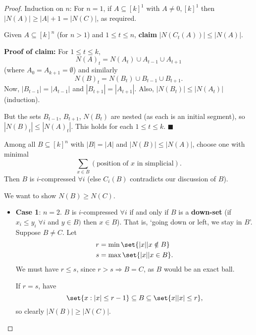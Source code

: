 \documentclass{article}
\let\subset\subseteq
\begin{document}
\begin{proof}
  Induction on $n$:
  For $n=1$, if $A \subset [k]^1$ with $A \neq 0, [k]^1$ then $|N(A)| \geq |A|+1 = |N(C)|$, as required.

  Given $A \subset [k]^n$ (for $n > 1$) and $1 \leq t \leq n$,
  \textbf{claim} $|N(C_t(A))| \leq |N(A)|$.

  \textbf{Proof of claim:}
  For $1 \leq t \leq k$,
  \begin{equation*}
    N(A)_t = N(A_t) \cup A_{t-1} \cup A_{t+1} %
  \end{equation*}
  (where $A_0 = A_{k+1}=\emptyset$) and similarly
  \begin{equation*}
    N(B)_t = N(B_t) \cup B_{t-1} \cup B_{t+1}.
  \end{equation*}
  Now, $|B_{t-1}| = |A_{t-1}|$ and $|B_{t+1}| = |A_{t+1}|$.
  Also, $|N(B_t)| \leq |N(A_t)|$ (induction).

  But the sets $B_{t-1}$, $B_{t+1}$, $N(B_t)$ are nested (as each is an initial segment), so $|N(B)_t| \leq |N(A)_t|$.
  This holds for each $1 \leq t \leq k$. $\blacksquare$

  Among all $B \subseteq [k]^n$ with $|B| = |A|$ and $|N(B)| \leq |N(A)|$, choose one with minimal
  \begin{equation*}
    \sum_{x \in B} (\text{position of $x$ in simplicial}).
  \end{equation*}
  Then $B$ is $i$-compressed $\forall i$ (else $C_i(B)$ contradicts our discussion of $B$).

  We want to show $N(B) \geq N(C)$.
  \begin{itemize}
    \item \textbf{Case 1}: $n=2$.
      $B$ is $i$-compressed $\forall i$ if and only if $B$ is a \textbf{down-set} (if $x_i \leq y_i \; \forall i$ and $y \in B)$ then $x \in B$). That is, `going down or left, we stay in $B$'.
      Suppose $B \neq C$.
      Let
      \begin{align*}
        r &= \min \set{\lvert x \rvert | x \notin B} \\
        s &= \max \set{\lvert x \rvert | x \in B}.
      \end{align*}
      We must have $r \leq s$, since $r > s \Rightarrow B = C$, as $B$ would be an exact ball.

      If $r=s$, have
      \begin{equation*}
        \set{x : |x| \leq r-1} \subset B \subset \set{x | |x|\leq r},
      \end{equation*}
      so clearly $|N(B)| \geq |N(C)|$.


\end{itemize}
\end{proof}
\end{document}

